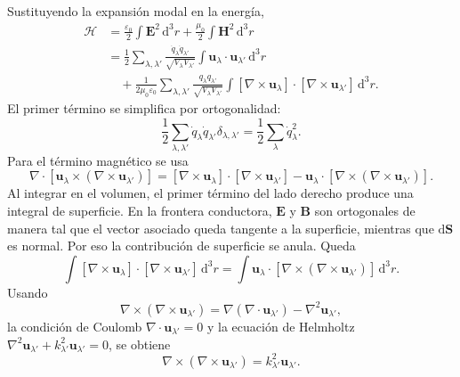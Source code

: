 \documentclass[11pt]{article}
\newcommand{\dd}{\mathrm{d}}
\newcommand{\vb}[1]{\mathbf{#1}}
\begin{document}
Sustituyendo la expansi\'on modal en la energ\'ia,
\begin{align}
  \mathcal H
  &=
  \frac{\varepsilon_0}{2}
  \int
  \vb E^2\,\dd^3r
  +
  \frac{\mu_0}{2}
  \int
  \vb H^2\,\dd^3r\\
  &=
  \frac{1}{2}
  \sum_{\lambda,\lambda'}
  \frac{\dot q_\lambda\dot q_{\lambda'}}
  {\sqrt{V_\lambda V_{\lambda'}}}
  \int
  \vb u_\lambda\cdot\vb u_{\lambda'}\,\dd^3r\\
  &\quad+
  \frac{1}{2\mu_0\varepsilon_0}
  \sum_{\lambda,\lambda'}
  \frac{q_\lambda q_{\lambda'}}
  {\sqrt{V_\lambda V_{\lambda'}}}
  \int
  [\nabla\times\vb u_\lambda]\cdot
  [\nabla\times\vb u_{\lambda'}]\,\dd^3r.
\end{align}
El primer t\'ermino se simplifica por ortogonalidad:
\begin{equation}
  \frac{1}{2}
  \sum_{\lambda,\lambda'}
  \dot q_\lambda\dot q_{\lambda'}
  \delta_{\lambda,\lambda'}
  =
  \frac{1}{2}\sum_\lambda \dot q_\lambda^2.
\end{equation}
Para el t\'ermino magn\'etico se usa
\begin{equation}
  \nabla\cdot[\vb u_\lambda\times(\nabla\times\vb u_{\lambda'})]
  =
  [\nabla\times\vb u_\lambda]\cdot
  [\nabla\times\vb u_{\lambda'}]
  -
  \vb u_\lambda\cdot
  [\nabla\times(\nabla\times\vb u_{\lambda'})].
\end{equation}
Al integrar en el volumen, el primer t\'ermino del lado derecho produce una
integral de superficie. En la frontera conductora, $\vb E$ y $\vb B$ son
ortogonales de manera tal que el vector asociado queda tangente a la
superficie, mientras que $\dd\vb S$ es normal. Por eso la contribuci\'on de
superficie se anula. Queda
\begin{equation}
  \int
  [\nabla\times\vb u_\lambda]\cdot
  [\nabla\times\vb u_{\lambda'}]\,\dd^3r
  =
  \int
  \vb u_\lambda\cdot
  [\nabla\times(\nabla\times\vb u_{\lambda'})]\,\dd^3r.
\end{equation}
Usando
\begin{equation}
  \nabla\times(\nabla\times\vb u_{\lambda'})
  =
  \nabla(\nabla\cdot\vb u_{\lambda'})
  -
  \nabla^2\vb u_{\lambda'},
\end{equation}
la condici\'on de Coulomb $\nabla\cdot\vb u_{\lambda'}=0$ y la ecuaci\'on de
Helmholtz $\nabla^2\vb u_{\lambda'}+k_{\lambda'}^2\vb u_{\lambda'}=0$,
se obtiene
\begin{equation}
  \nabla\times(\nabla\times\vb u_{\lambda'})
  =
  k_{\lambda'}^2\vb u_{\lambda'}.
\end{equation}
\end{document}
